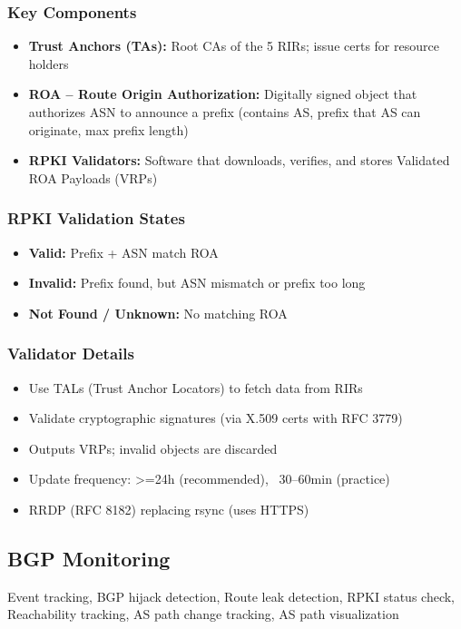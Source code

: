 \begin{multicols*}{5}
		\subsubsection*{Key Components}
		\begin{itemize}
			\item \textbf{Trust Anchors (TAs):} Root CAs of the 5 RIRs; issue certs for resource holders
			\item \textbf{ROA – Route Origin Authorization:} Digitally signed object that authorizes ASN to announce a prefix (contains AS, prefix that AS can originate, max prefix length)
			\item \textbf{RPKI Validators:} Software that downloads, verifies, and stores Validated ROA Payloads (VRPs)
		\end{itemize}
		
		\subsubsection*{RPKI Validation States}
		\begin{itemize}
			\item \textbf{Valid:} Prefix + ASN match ROA
			\item \textbf{Invalid:} Prefix found, but ASN mismatch or prefix too long
			\item \textbf{Not Found / Unknown:} No matching ROA
		\end{itemize}
		
		\subsubsection*{Validator Details}
		\begin{itemize}
			\item Use TALs (Trust Anchor Locators) to fetch data from RIRs
			\item Validate cryptographic signatures (via X.509 certs with RFC 3779)
			\item Outputs VRPs; invalid objects are discarded
			\item Update frequency: >=24h (recommended), ~30–60min (practice)
			\item RRDP (RFC 8182) replacing rsync (uses HTTPS)
		\end{itemize}
		
		\subsection{BGP Monitoring}
		Event tracking, BGP hijack detection, Route leak detection, RPKI status check, Reachability tracking, AS path change tracking, AS path visualization
		

\end{multicols*}
